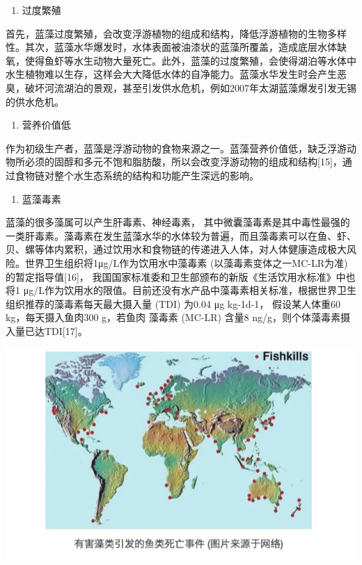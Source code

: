 \documentclass[
]{book}
\providecommand{\tightlist}{%
  \setlength{\itemsep}{0pt}\setlength{\parskip}{0pt}}
\begin{document}
\begin{enumerate}
\def\labelenumi{\arabic{enumi}.}
\tightlist
\item
  过度繁殖
\end{enumerate}

首先，蓝藻过度繁殖，会改变浮游植物的组成和结构，降低浮游植物的生物多样性。其次，蓝藻水华爆发时，水体表面被油漆状的蓝藻所覆盖，造成底层水体缺氧，使得鱼虾等水生动物大量死亡。此外，蓝藻的过度繁殖，会使得湖泊等水体中水生植物难以生存，这样会大大降低水体的自净能力。蓝藻水华发生时会产生恶臭，破坏河流湖泊的景观，甚至引发供水危机，例如2007年太湖蓝藻爆发引发无锡的供水危机。

\begin{enumerate}
\def\labelenumi{\arabic{enumi}.}
\setcounter{enumi}{1}
\tightlist
\item
  营养价值低
\end{enumerate}

作为初级生产者，蓝藻是浮游动物的食物来源之一。蓝藻营养价值低，缺乏浮游动物所必须的固醇和多元不饱和脂肪酸，所以会改变浮游动物的组成和结构{[}15{]}，通过食物链对整个水生态系统的结构和功能产生深远的影响。

\begin{enumerate}
\def\labelenumi{\arabic{enumi}.}
\setcounter{enumi}{2}
\tightlist
\item
  蓝藻毒素
\end{enumerate}

蓝藻的很多藻属可以产生肝毒素、神经毒素， 其中微囊藻毒素是其中毒性最强的一类肝毒素。藻毒素在发生蓝藻水华的水体较为普遍，而且藻毒素可以在鱼、虾、贝、螺等体内累积，通过饮用水和食物链的传递进入人体，对人体健康造成极大风险。世界卫生组织将1μg/L作为饮用水中藻毒素 (以藻毒素变体之一MC-LR为准) 的暂定指导值{[}16{]}， 我国国家标准委和卫生部颁布的新版《生活饮用水标准》中也将1 μg/L作为饮用水的限值。目前还没有水产品中藻毒素相关标准，根据世界卫生组织推荐的藻毒素每天最大摄入量 (TDI) 为0.04 μg kg-1d-1， 假设某人体重60 kg，每天摄入鱼肉300 g，若鱼肉 藻毒素 (MC-LR) 含量8 ng/g，则个体藻毒素摄入量已达TDI{[}17{]}。

\includegraphics[width=8.33in]{images/lanzao3}
\end{document}

